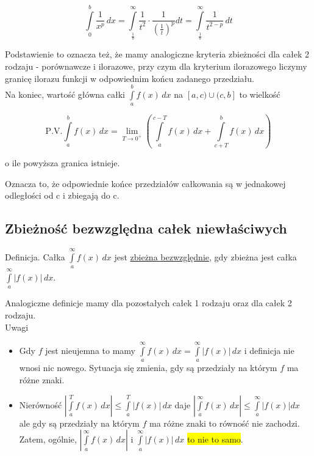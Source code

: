 $$ \int\limits_{0}^{b} \frac{1}{x^p} \,dx = \int\limits_{\frac{1}{b}}^{\infty} \frac{1}{t^2} \cdot \frac{1}{ \left( \frac{1}{t} \right)^p } dt
= \int\limits_{\frac{1}{b}}^{\infty} \frac{1}{t^{2 - p}} \,dt $$

Podstawienie to oznacza też, że mamy analogiczne kryteria zbieżności dla całek 2 rodzaju - porównawcze i ilorazowe, przy
czym dla kryterium ilorazowego liczymy granicę ilorazu funkcji w odpowiednim końcu zadanego przedziału. \\

Na koniec, wartość główna całki $ \int\limits_{a}^{b} f(x) \,dx $ na $[a,c)\cup(c,b]$ to wielkość

$$ \textrm{P.V.} \int\limits_{a}^{b} f(x) \,dx = \lim_{T \to 0^+} 
\left( \int\limits_{a}^{c - T} f(x) \,dx + \int\limits_{c + T}^{b} f(x) \,dx \right) $$

o ile powyższa granica istnieje.

Oznacza to, że odpowiednie końce przedziałów całkowania są w jednakowej odległości od c i zbiegają do c.

\subsection*{Zbieżność bezwzględna całek niewłaściwych}

Definicja. Całka $ \int\limits_{a}^{\infty} f(x) \,dx $ jest \underline{zbieżna bezwzględnie}, gdy zbieżna jest całka
$ \int\limits_{a}^{\infty} |f(x)| \,dx $.

Analogiczne definicje mamy dla pozostałych całek 1 rodzaju oraz dla całek 2 rodzaju. \\

Uwagi

\begin{itemize}
    \item Gdy $f$ jest nieujemna to mamy $ \int\limits_{a}^{\infty} f(x) \,dx = \int\limits_{a}^{\infty} |f(x)| \,dx $
    i definicja nie wnosi nic nowego. Sytuacja się zmienia, gdy są przedziały na którym $f$ ma różne znaki.
    
    \item Nierówność $ \left| \int\limits_{a}^{T} f(x) \,dx \right| \leq \int\limits_{a}^{T} |f(x)| \,dx $ daje
    $ \left| \int\limits_{a}^{\infty} f(x) \,dx \right| \leq \int\limits_{a}^{\infty} |f(x)| dx $ ale gdy są przedziały
    na którym $f$ ma różne znaki to równość nie zachodzi.
    Zatem, ogólnie, $ \left| \int\limits_{a}^{\infty} f(x) \,dx \right| $ i $ \int\limits_{a}^{\infty} |f(x)| \,dx $
    \colorbox{yellow}{to nie to samo}. \\
\end{itemize}

